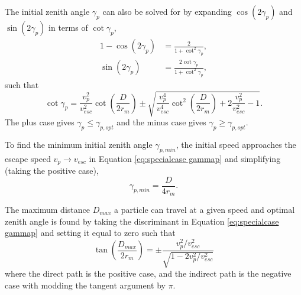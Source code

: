 \documentclass{article}
\begin{document}
The initial zenith angle $\gamma_p$ can also be solved for by expanding $\cos(2\gamma_p)$ and $\sin(2\gamma_p)$ in terms of $\cot\gamma_p$,
\begin{align}\label{eq:1-cos 2g to cot g}
1-\cos(2\gamma_p) &= \frac{2}{1+\cot^2\gamma_p},\\\label{eq:sin 2g to cot g}
\sin(2\gamma_p) &= \frac{2\cot\gamma_p}{1+\cot^2\gamma_p},
\end{align}
such that
\begin{equation}\label{eq:specialcase gammap}
\cot\gamma_p = \frac{v_p^2}{v_{esc}^2}\cot\left(\frac{D}{2r_m}\right) \pm \sqrt{\frac{v_p^4}{v_{esc}^4}\cot^2\left(\frac{D}{2r_m}\right) + 2\frac{v_p^2}{v_{esc}^2}-1}.
\end{equation}
The plus case gives $\gamma_p \le \gamma_{p,opt}$ and the minus case gives  $\gamma_p \ge \gamma_{p,opt}$.

To find the minimum initial zenith angle $\gamma_{p,min}$, the initial speed approaches the escape speed $v_p\to v_{esc}$ in Equation \eqref{eq:specialcase gammap} and simplifying (taking the positive case),
\begin{equation}\label{eq:gpmin_special}
\gamma_{p,min} = \frac{D}{4r_m}.
\end{equation}


The maximum distance $D_{max}$ a particle can travel at a given speed and optimal zenith angle is found by taking the discriminant in Equation \eqref{eq:specialcase gammap} and setting it equal to zero such that
\begin{equation}\label{eq:Dmax}
\tan\left(\frac{D_{max}}{2r_m}\right) = \pm\frac{v_p^2/v_{esc}^2}{\sqrt{1-2v_p^2/v_{esc}^2}}
\end{equation}
where the direct path is the positive case, and the indirect path is the negative case with modding the tangent argument by $\pi$.
\end{document}
